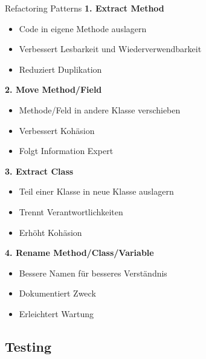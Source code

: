 \begin{KR}{Refactoring Patterns}
\textbf{1. Extract Method}
\begin{itemize}
    \item Code in eigene Methode auslagern
    \item Verbessert Lesbarkeit und Wiederverwendbarkeit
    \item Reduziert Duplikation
\end{itemize}

\textbf{2. Move Method/Field}
\begin{itemize}
    \item Methode/Feld in andere Klasse verschieben
    \item Verbessert Kohäsion
    \item Folgt Information Expert
\end{itemize}

\textbf{3. Extract Class}
\begin{itemize}
    \item Teil einer Klasse in neue Klasse auslagern
    \item Trennt Verantwortlichkeiten
    \item Erhöht Kohäsion
\end{itemize}

\textbf{4. Rename Method/Class/Variable}
\begin{itemize}
    \item Bessere Namen für besseres Verständnis
    \item Dokumentiert Zweck
    \item Erleichtert Wartung
\end{itemize}
\end{KR}

\subsection{Testing}


